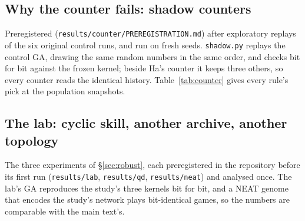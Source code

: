 \documentclass[11pt]{article}
\begin{document}
\begin{table}[!htbp]
\centering\small
\caption{Export rules on the same population snapshots, \nXRuns{} fresh
Slime Volleyball control runs. Level and declines: held-out score of the
exported member against the 2015 baseline. Only the 16-peer tournament was
tested; the other rows are described.}
\label{tab:exporttest}
\resizebox{\linewidth}{!}{}
\end{table}

\begin{table}[!htbp]
\centering\small
\caption{Export rules in the discmix game, judged by outsider strength (exact
expected score against the other runs' populations at the same $\lambda$ and
snapshot).}
\label{tab:exporttestlab}
\resizebox{\linewidth}{!}{}
\end{table}

\subsection{Why the counter fails: shadow counters}
\label{app:counter}

Preregistered (\texttt{results/counter/PREREGISTRATION.md}) after exploratory
replays of the six original control runs, and run on \nCtrRuns{} fresh seeds.
\texttt{shadow.py} replays the control GA, drawing the same random numbers in
the same order, and checks bit for bit against the frozen kernel; beside Ha's
counter it keeps three others, so every counter reads the identical history.
Table~\ref{tab:counter} gives every rule's pick at the population snapshots.

\begin{table}[!htbp]
\centering\small
\caption{Four bookkeepings of the streak counter on the same histories, with
the 16-peer tournament, the median and the best member for comparison.
Level and declines: held-out score of the exported member against the 2015
baseline; curve volatility: mean absolute change of the counter's reported
curve between checkpoints.}
\label{tab:counter}
\resizebox{\linewidth}{!}{}
\end{table}

\subsection{The lab: cyclic skill, another archive, another topology}
\label{app:lab}

The three experiments of \S\ref{sec:robust}, each preregistered in the
repository before its first run (\texttt{results/lab}, \texttt{results/qd},
\texttt{results/neat}) and analysed once. The lab's GA reproduces the study's
three kernels bit for bit, and a NEAT genome that encodes the study's network
plays bit-identical games, so the numbers are comparable with the main text's.
\end{document}
